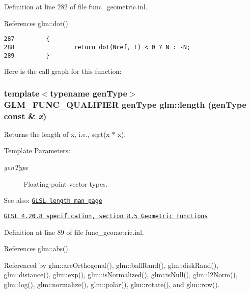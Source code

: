 Definition at line 282 of file func\_\-geometric.inl.

References glm::dot().

\begin{Code}\begin{verbatim}287         {
288                 return dot(Nref, I) < 0 ? N : -N;
289         }
\end{verbatim}
\end{Code}




Here is the call graph for this function:\hypertarget{group__core__func__geometric_gd73a94d9c967e619e670156356e93b7e}{
\subsubsection[length]{\setlength{\rightskip}{0pt plus 5cm}template$<$typename genType$>$ GLM\_\-FUNC\_\-QUALIFIER genType glm::length (genType const \& {\em x})}}
\label{group__core__func__geometric_gd73a94d9c967e619e670156356e93b7e}


Returns the length of x, i.e., sqrt(x $\ast$ x).

\begin{Desc}
\item[Template Parameters:]
\begin{description}
\item[{\em genType}]Floating-point vector types.\end{description}
\end{Desc}
\begin{Desc}
\item[See also:]\href{http://www.opengl.org/sdk/docs/manglsl/xhtml/length.xml}{\tt GLSL length man page} 

\href{http://www.opengl.org/registry/doc/GLSLangSpec.4.20.8.pdf}{\tt GLSL 4.20.8 specification, section 8.5 Geometric Functions} \end{Desc}


Definition at line 89 of file func\_\-geometric.inl.

References glm::abs().

Referenced by glm::areOrthogonal(), glm::ballRand(), glm::diskRand(), glm::distance(), glm::exp(), glm::isNormalized(), glm::isNull(), glm::l2Norm(), glm::log(), glm::normalize(), glm::polar(), glm::rotate(), and glm::row().

